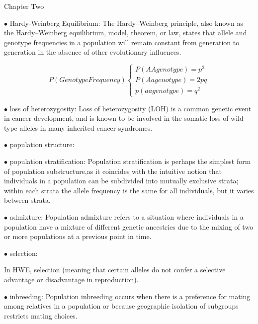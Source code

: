 \documentclass{article}
\begin{document}
\newpage
\centerline{\sc Chapter Two}


\vspace{1pc}
$\bullet$ Hardy-Weinberg Equilibrium:
The Hardy–Weinberg principle, also known as the Hardy–Weinberg equilibrium, model, theorem, or law, states that allele and genotype frequencies in a population will remain constant from generation to generation in the absence of other evolutionary influences.



 \[
    P(Genotype Frequency)\left\{
                \begin{array}{ll}
                  P(AA genotype) = p^{2}\\
                  P(Aa genotype) = 2pq\\
                  p(aa genotype) = q^{2}
                \end{array}
              \right.
  \]


\vspace{1pc}
$\bullet$ loss of heterozygosity:
Loss of heterozygosity (LOH) is a common genetic event in cancer development, and is known to be involved in the somatic loss of wild-type alleles in many inherited cancer syndromes.

\vspace{1pc}
$\bullet$ population structure:


\vspace{1pc}
$\bullet$ population stratification:
Population stratification is perhaps the simplest form of population substructure,as it coincides with the intuitive notion that individuals in a population can be subdivided into mutually exclusive strata; within each strata the allele frequency is the same for all individuals, but it varies between strata.


\vspace{1pc}
$\bullet$ admixture:
Population admixture refers to a situation where individuals in a population have a mixture of different genetic ancestries due to the mixing of two or more populations at a previous point in time.

\vspace{1pc}
$\bullet$ selection:

In HWE, selection (meaning that certain alleles do not confer a selective advantage or disadvantage in reproduction).

\vspace{1pc}
$\bullet$ inbreeding:
Population inbreeding occurs when there is a preference for mating among relatives in a population or because geographic isolation of subgroups restricts mating choices.
\end{document}
